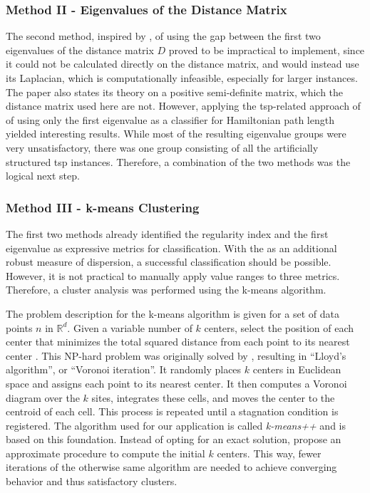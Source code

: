 \subsubsection{Method II - Eigenvalues of the Distance Matrix}

The second method, inspired by \citet{lovasz20071}, of using the gap between the first two eigenvalues of the distance matrix $D$ proved to be impractical to implement, since it could not be calculated directly on the distance matrix, and would instead use its Laplacian, which is computationally infeasible, especially for larger instances. The paper also states its theory on a positive semi-definite matrix, which the distance matrix used here are not. However, applying the \gls{tsp}-related approach of \citet{cvetkovic2018traveling} of using only the first eigenvalue as a classifier for Hamiltonian path length yielded interesting results. While most of the resulting eigenvalue groups were very unsatisfactory, there was one group consisting of all the artificially structured \gls{tsp} instances. Therefore, a combination of the two methods was the logical next step.

\subsubsection{Method III - k-means Clustering }

The first two methods already identified the regularity index and the first eigenvalue as expressive metrics for classification. With the  as an additional robust measure of dispersion, a successful classification should be possible. However, it is not practical to manually apply value ranges to three metrics. Therefore, a cluster analysis was performed using the k-means algorithm. 

The problem description for the k-means algorithm is given for a set of data points $n$ in $\mathbb{R}^d$. Given a variable number of $k$ centers, select the position of each center that minimizes the total squared distance from each point to its nearest center \cite{arthur2006k}. This NP-hard problem was originally solved by \citet{lloyd1982least}, resulting in \enquote{Lloyd's algorithm}, or \enquote{Voronoi iteration}. It randomly places $k$ centers in Euclidean space and assigns each point to its nearest center. It then computes a Voronoi diagram over the $k$ sites, integrates these cells, and moves the center to the centroid of each cell. This process is repeated until a stagnation condition is registered. The algorithm used for our application is called \textit{k-means++} and is based on this foundation. Instead of opting for an exact solution, \citet{arthur2006k} propose an approximate procedure to compute the initial $k$ centers. This way, fewer iterations of the otherwise same algorithm are needed to achieve converging behavior and thus satisfactory clusters. 

